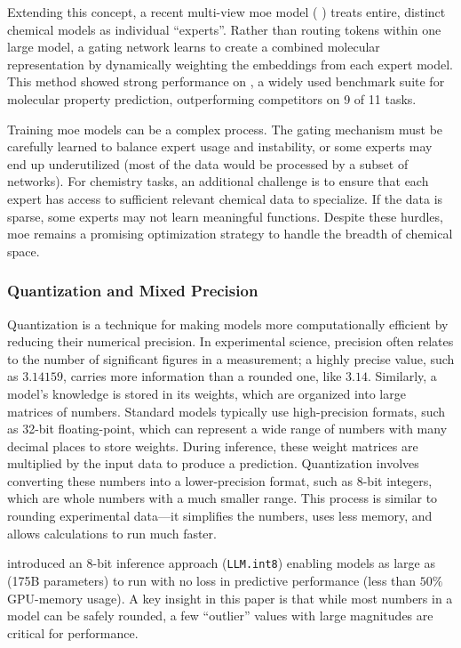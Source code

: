 Extending this concept, a recent multi-view \gls{moe} model ( \autocite{shirasuna2024multi}) treats entire, distinct chemical models as individual \enquote{experts}. Rather than routing tokens within one large model, a gating network learns to create a combined molecular representation by dynamically weighting the embeddings from each expert model. This method showed strong performance on , a widely used benchmark suite for molecular property prediction, outperforming competitors on 9 of 11 tasks.


Training \gls{moe} models can be a complex process. The gating mechanism must be carefully learned to balance expert usage and instability, or some experts may end up underutilized (most of the data would be processed by a subset of networks). \autocite {fedus2022switch} For chemistry tasks, an additional challenge is to ensure that each expert has access to sufficient relevant chemical data to specialize. If the data is sparse, some experts may not learn meaningful functions. Despite these hurdles, \gls{moe} remains a promising optimization strategy to handle the breadth of chemical space.



\subsubsection{Quantization and Mixed Precision}
\label{sec:quantization}
Quantization is a technique for making models more computationally efficient by reducing their numerical precision. 
In experimental science, precision often relates to the number of significant figures in a measurement; a highly precise value, such as $3.14159$, carries more information than a rounded one, like $3.14$. 
Similarly, a model's knowledge is stored in its weights, which are organized into large matrices of numbers. 
Standard models typically use high-precision formats, such as 32-bit floating-point, which can represent a wide range of numbers with many decimal places to store weights. During inference, these weight matrices are multiplied by the input data to produce a prediction. Quantization involves converting these numbers into a lower-precision format, such as 8-bit integers, which are whole numbers with a much smaller range. This process is similar to rounding experimental data---it simplifies the numbers, uses less memory, and allows calculations to run much faster.

 
\textcite{dettmers2022gpt3} introduced an 8-bit inference approach (\texttt{LLM.int8}) enabling models as large as  (175B parameters) to run with no loss in predictive performance (less than $50\%$ GPU-memory usage).  
A key insight in this paper is that while most numbers in a model can be safely rounded, a few \enquote{outlier} values with large magnitudes are critical for performance. 

